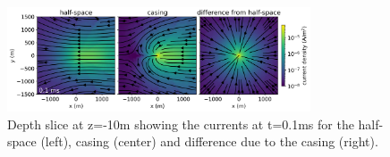 \begin{figure}[!htb]
    \begin{center}
    \includegraphics[width=0.8\textwidth]{figures/tdem-currents-depth-slice.png}
    \end{center}
\caption{
    Depth slice at z=-10m showing the currents at t=0.1ms for the half-space (left), casing (center) and difference due to the casing (right).
}
\label{fig:tdem-currents-depth-slice}
\end{figure}
